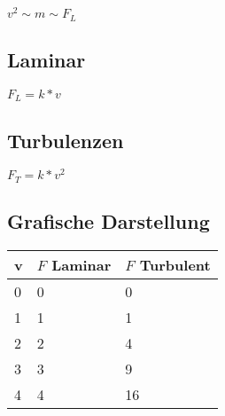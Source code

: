 \(v^2 \sim m \sim F_L\)

\subsection{Laminar}

\(F_L = k * v\)

\subsection{Turbulenzen}

\(F_T = k * v^2 \)

\subsection{Grafische Darstellung}

\begin{tabular}{|l|l|l|}
	\hline
	\textbf{v} & \textbf{\(F\) Laminar} & \textbf{\(F\) Turbulent} \\
	\hline
	0 & 0 & 0\\ \hline
	1 & 1 & 1\\ \hline
	2 & 2 & 4\\ \hline
	3 & 3 & 9\\ \hline
	4 & 4 & 16\\ \hline
	
\end{tabular}